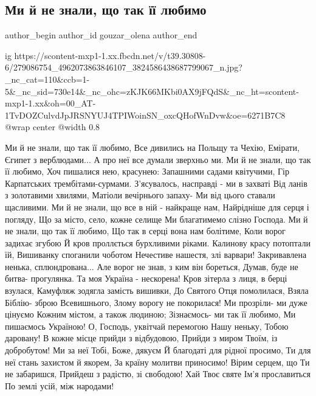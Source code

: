  
 
 
 
 
\subsection{Ми й не знали, що так її любимо}
\label{sec:26_04_2022.fb.gouzar_olena.1.ne_znaly_scho_tak_ii_ljubymo}
 
\ifcmt
 author_begin
   author_id gouzar_olena
 author_end
\fi


\ifcmt
  ig https://scontent-mxp1-1.xx.fbcdn.net/v/t39.30808-6/279086754_4962073863846107_3824586438687799067_n.jpg?_nc_cat=110&ccb=1-5&_nc_sid=730e14&_nc_ohc=zKJK66MKbi0AX9jFQdS&_nc_ht=scontent-mxp1-1.xx&oh=00_AT-1TvDOZCulvdJpJRSNYUJ4TPIWoinSN_oxcQHofWnDvw&oe=6271B7C8
  @wrap center
  @width 0.8
\fi

\raggedcolumns
\begin{multicols}{3} %
\setlength{\parindent}{0pt}

\obeycr
Ми й не знали, що так її любимо,
Все дивились на Польщу та Чехію,
Емірати, Єгипет з верблюдами...
А про неї все думали зверхньо ми.
\smallskip
Ми й не знали, що так її любимо,
Хоч пишалися нею, красунею:
Запашними садами квітучими,
Гір Карпатських трембітами-сурмами.
\smallskip
З'ясувалось, насправді - ми в захваті
Від ланів з золотавими хвилями,
Матіоли вечірнього запаху-
Ми від цього ставали щасливими.
\smallskip
Ми й не знали, що все в ній - найкраще нам,
Найрідніше для серця і погляду,
Що за місто, село, кожне селище
Ми благатимемо слізно Господа.
\smallskip
Ми й не знали, що так її любимо,
Що так в серці вона нам болітиме,
Коли ворог задихає згубою
Й кров проллється бурхливими ріками.
\smallskip
Калинову красу потоптали їй,
Вишиванку споганили чоботом
Нечестиве нашестя, злі варвари!
Закривавлена ненька, сплюндрована...
\smallskip
Але ворог не знав, з ким він бореться,
Думав, буде не битва- прогулянка.
Та моя Україна - нескорена!
\smallskip
Кров зітерла з лиця, в берці взулася,
Камуфляж зодягла замість вишивки,
До Святого Отця помолилася,
Взяла Біблію- зброю Всевишнього,
Злому ворогу не покорилася!
\smallskip
Ми прозріли- ми дуже цінуємо
Кожним містом, а також людиною;
Зізнаємось- ми так її любимо,
Ми пишаємось Україною!
\smallskip
О, Господь, уквітчай перемогою
Нашу неньку, Тобою даровану!
В кожне місце прийди з відбудовою,
Прийди з миром Твоїм, із добробутом!
\smallskip
Ми за неї Тобі, Боже, дякуєм
Й благодаті для рідної просимо,
Ти для неї стань захистом й якорем,
За країну молитви приносимо!
\smallskip
Вірим серцем, що Ти не забаришся,
Прийдеш з радістю, зі свободою!
Хай Твоє святе Ім'я прославиться
По землі усій, між народами!
\restorecr

\end{multicols} %
